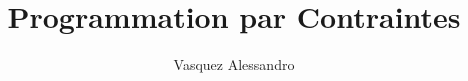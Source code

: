 \documentclass[french]{article}
\begin{document}
\title{Programmation par Contraintes}
\author{Vasquez Alessandro}
\maketitle
\newpage
\end{document}
